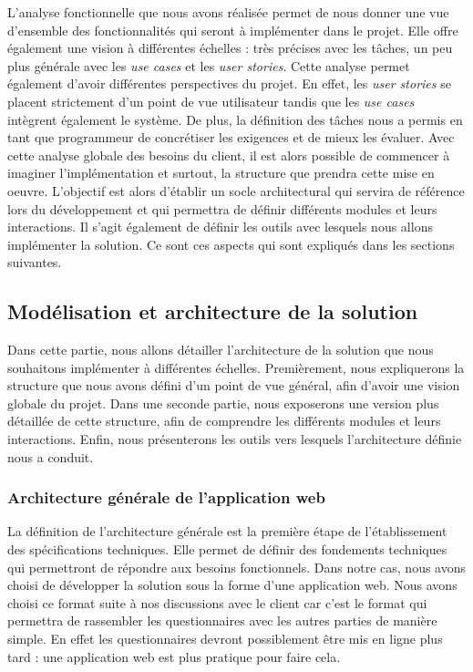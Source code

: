 \documentclass{article}
\begin{document}
L'analyse fonctionnelle que nous avons réalisée permet de nous donner une vue d'ensemble des fonctionnalités
qui seront à implémenter dans le projet. Elle offre également une vision à différentes échelles : très précises avec 
les tâches, un peu plus générale avec les \textit{use cases} et les \textit{user stories}.
Cette analyse permet également d'avoir différentes perspectives du projet. En effet, les \textit{user stories}
se placent strictement d'un point de vue utilisateur tandis que les \textit{use cases} intègrent également le système.
De plus, la définition des tâches nous a permis en tant que programmeur de concrétiser les exigences et de mieux les évaluer.
Avec cette analyse globale des besoins du client, il est alors possible de commencer à imaginer l'implémentation
et surtout, la structure que prendra cette mise en oeuvre.
L'objectif est alors d'établir un socle architectural qui servira de référence lors du développement et qui
permettra de définir différents modules et leurs interactions. Il s'agit également de définir les outils avec lesquels nous 
allons implémenter la solution. Ce sont ces aspects qui sont expliqués dans les sections suivantes.

\subsection{Modélisation et architecture de la solution}

Dans cette partie, nous allons détailler l'architecture de la solution que nous souhaitons implémenter à différentes échelles.
Premièrement, nous expliquerons la structure que nous avons défini d'un point de vue général, afin d'avoir une vision globale du projet.
Dans une seconde partie, nous exposerons une version plus détaillée de cette structure, afin de comprendre les différents modules et leurs interactions.
Enfin, nous présenterons les outils vers lesquels l'architecture définie nous a conduit.

\subsubsection{Architecture générale de l'application web}

La définition de l'architecture générale est la première étape de l'établissement des spécifications techniques. Elle permet
de définir des fondements techniques qui permettront de répondre aux besoins fonctionnels.
Dans notre cas, nous avons choisi de développer la solution sous la forme d'une application web. Nous avons choisi ce format suite 
à nos discussions avec le client car c'est le format qui permettra de rassembler les questionnaires avec les autres parties de manière simple. En effet les questionnaires devront possiblement être mis en ligne plus tard : une application web est plus pratique pour faire cela.
\end{document}
